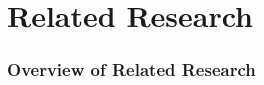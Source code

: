 \section{Related Research}
\begin{frame}[c]
    \frametitle{Overview of Related Research}
    \begin{center}
        
    \end{center}
\end{frame}



